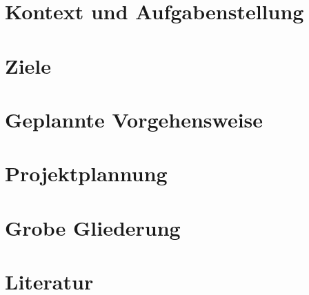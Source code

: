 \documentclass[12pt,a4paper,oneside,ngerman]{article}
\begin{document}
\section {Kontext und Aufgabenstellung}


\section {Ziele}


\section {Geplannte Vorgehensweise}


\section {Projektplannung}


\section {Grobe Gliederung}


\section {Literatur}

\end{document}
